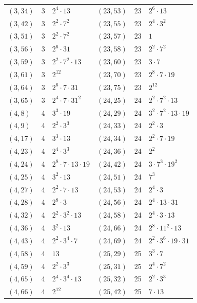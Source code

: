 \documentclass[11pt]{article}
\begin{document}
\begin{longtable}{@{}lrl@{\qquad}lrl@{}}
$(3,34)$ & 3 & $2^{4}\cdot 13$ & $(23,53)$ & 23 & $2^{6}\cdot 13$\\
$(3,42)$ & 3 & $2^{2}\cdot 7^{2}$ & $(23,55)$ & 23 & $2^{4}\cdot 3^{2}$\\
$(3,51)$ & 3 & $2^{2}\cdot 7^{2}$ & $(23,57)$ & 23 & $1$\\
$(3,56)$ & 3 & $2^{6}\cdot 31$ & $(23,58)$ & 23 & $2^{2}\cdot 7^{2}$\\
$(3,59)$ & 3 & $2^{2}\cdot 7^{2}\cdot 13$ & $(23,60)$ & 23 & $3\cdot 7$\\
$(3,61)$ & 3 & $2^{12}$ & $(23,70)$ & 23 & $2^{8}\cdot 7\cdot 19$\\
$(3,64)$ & 3 & $2^{6}\cdot 7\cdot 31$ & $(23,75)$ & 23 & $2^{12}$\\
$(3,65)$ & 3 & $2^{4}\cdot 7\cdot 31^{2}$ & $(24,25)$ & 24 & $2^{2}\cdot 7^{2}\cdot 13$\\
$(4,8)$ & 4 & $3^{3}\cdot 19$ & $(24,29)$ & 24 & $3^{2}\cdot 7^{2}\cdot 13\cdot 19$\\
$(4,9)$ & 4 & $2^{2}\cdot 3^{3}$ & $(24,33)$ & 24 & $2^{2}\cdot 3$\\
$(4,17)$ & 4 & $3^{3}\cdot 13$ & $(24,34)$ & 24 & $2^{2}\cdot 7\cdot 19$\\
$(4,23)$ & 4 & $2^{4}\cdot 3^{3}$ & $(24,36)$ & 24 & $2^{2}$\\
$(4,24)$ & 4 & $2^{8}\cdot 7\cdot 13\cdot 19$ & $(24,42)$ & 24 & $3\cdot 7^{3}\cdot 19^{2}$\\
$(4,25)$ & 4 & $3^{2}\cdot 13$ & $(24,51)$ & 24 & $7^{3}$\\
$(4,27)$ & 4 & $2^{2}\cdot 7\cdot 13$ & $(24,53)$ & 24 & $2^{4}\cdot 3$\\
$(4,28)$ & 4 & $2^{8}\cdot 3$ & $(24,56)$ & 24 & $2^{4}\cdot 13\cdot 31$\\
$(4,32)$ & 4 & $2^{2}\cdot 3^{2}\cdot 13$ & $(24,58)$ & 24 & $2^{4}\cdot 3\cdot 13$\\
$(4,36)$ & 4 & $3^{2}\cdot 13$ & $(24,66)$ & 24 & $2^{8}\cdot 11^{2}\cdot 13$\\
$(4,43)$ & 4 & $2^{2}\cdot 3^{4}\cdot 7$ & $(24,69)$ & 24 & $2^{2}\cdot 3^{6}\cdot 19\cdot 31$\\
$(4,58)$ & 4 & $13$ & $(25,29)$ & 25 & $3^{3}\cdot 7$\\
$(4,59)$ & 4 & $2^{2}\cdot 3^{3}$ & $(25,31)$ & 25 & $2^{4}\cdot 7^{2}$\\
$(4,65)$ & 4 & $2^{4}\cdot 3^{4}\cdot 13$ & $(25,32)$ & 25 & $2^{2}\cdot 3^{3}$\\
$(4,66)$ & 4 & $2^{12}$ & $(25,42)$ & 25 & $7\cdot 13$\\

\end{longtable}
\end{document}
